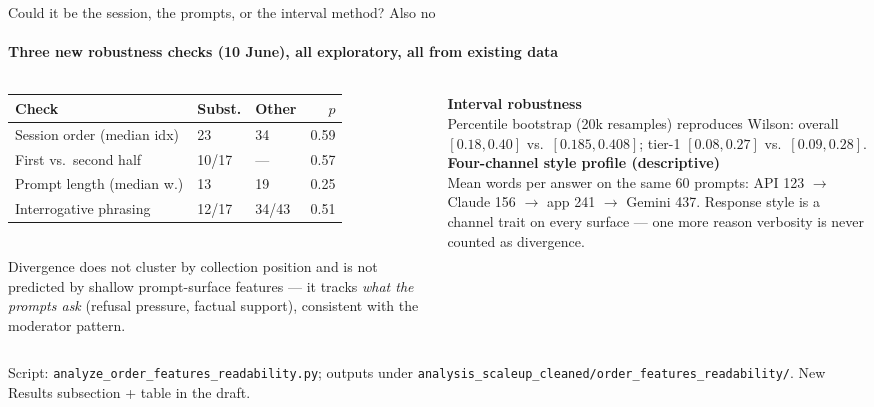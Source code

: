 \documentclass[aspectratio=169,onlytextwidth]{beamer}
\newcommand{\slidefoot}[1]{\vfill{\scriptsize\color{muted}#1}}
\begin{document}
\begin{frame}[shrink=12]{Could it be the session, the prompts, or the interval method? Also no}
\framesubtitle{Three new robustness checks (10 June), all exploratory, all from existing data}
\begin{columns}[T,totalwidth=\textwidth]
\begin{column}{0.52\textwidth}
\small
\renewcommand{\arraystretch}{1.25}
\begin{tabular}{p{}llr}
\toprule
\textbf{Check} & \textbf{Subst.} & \textbf{Other} & $p$ \\
\midrule
Session order (median idx) & 23 & 34 & 0.59 \\
First vs.\ second half & 10/17 & --- & 0.57 \\
Prompt length (median w.) & 13 & 19 & 0.25 \\
Interrogative phrasing & 12/17 & 34/43 & 0.51 \\
\bottomrule
\end{tabular}\\[6pt]
\small Divergence does not cluster by collection position and is not predicted by shallow prompt-surface features --- it tracks \emph{what the prompts ask} (refusal pressure, factual support), consistent with the moderator pattern.
\end{column}
\begin{column}{0.44\textwidth}
\textbf{Interval robustness}\\[3pt]
\small Percentile bootstrap (20k resamples) reproduces Wilson: overall $[0.18,0.40]$ vs.\ $[0.185,0.408]$; tier-1 $[0.08,0.27]$ vs.\ $[0.09,0.28]$.\\[8pt]
\textbf{Four-channel style profile (descriptive)}\\[3pt]
\small Mean words per answer on the same 60 prompts: API 123 $\rightarrow$ Claude 156 $\rightarrow$ app 241 $\rightarrow$ Gemini 437. Response style is a channel trait on every surface --- one more reason verbosity is never counted as divergence.
\end{column}
\end{columns}
\slidefoot{Script: \texttt{analyze\_order\_features\_readability.py}; outputs under \texttt{analysis\_scaleup\_cleaned/order\_features\_readability/}. New Results subsection + table in the draft.}
\end{frame}
\end{document}
